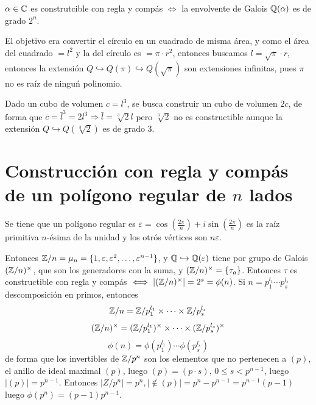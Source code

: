  \begin{teo}
    $\alpha \in \mathbb{C}$ es construtcible con regla y comp\'as $\iff$ la envolvente de Galois $\mathbb{Q}(\alpha)$ es de grado $2^n$.  
 \end{teo}
 \begin{custom}
 El objetivo era convertir el c\'irculo en un cuadrado de misma \'area, y como el \'area del cuadrado $=l^2$ y la del c\'irculo es $=\pi \cdot r^2$, entonces buscamos $ l = \sqrt{\pi} \cdot r$, entonces la extensi\'on $Q \hookrightarrow Q(\pi) \hookrightarrow Q(\sqrt{\pi})$ son extensiones infinitas, pues $\pi$ no es ra\'iz de ningu\'n polinomio.
 \end{custom}
 \begin{custom}
     Dado un cubo de volumen $c=l^3$, se busca construir un cubo de volumen $2c$, de forma que $\bar c = \bar l^3 = 2l^3 \Rightarrow \bar l = \sqrt[3]{2} l$
    pero $\sqrt[3]{2}$ no es constructible aunque la extensi\'on $Q \hookrightarrow Q(\sqrt[3]{2})$ es de grado 3. 
 \end{custom}
 \section{Construcci\'on con regla y comp\'as de un pol\'igono regular de $n$ lados}
 Se tiene que un pol\'igono regular es $\varepsilon = \cos(\frac{2\pi}{n}) + i \sin(\frac{2\pi}{n})$ es la ra\'iz primitiva $n$-\'esima de la unidad y los otr\'os v\'ertices son $n \varepsilon$. 

 Entonces $\mathbb{Z}/n = \mu_n = \{1, \varepsilon , \varepsilon^2, \ldots, \varepsilon^{n-1}\}$,  y  $\mathbb{Q} \hookrightarrow \mathbb{Q}(\varepsilon)$ tiene por grupo de Galois $(\mathbb{Z}/n)^{\times}$, que son los generadores con la suma, y $(\mathbb{Z}/n)^{\times} = \{\tau_a\}$. Entonces $\tau$ es constructible con regla y comp\'as $\iff |(\mathbb{Z}/n)^{\times}| = 2^s = \phi(n)$. Si $n=p_1^{l_1}\cdots p_s^{l_s}$ descomposici\'on en primos, entonces 
 $$\mathbb{Z} / n = \mathbb{Z} / p_1^{l_1} \times \cdots \times \mathbb{Z} / p_s^{l_s}$$
 $$(\mathbb{Z}/n)^{\times} = (\mathbb{Z} / p_1^{l_1})^{\times}  \times \cdots \times (\mathbb{Z} / p_s^{l_s} )^{\times} $$
 $$\phi(n) = \phi(p_1^{l_1})\cdots \phi(p_s^{l_s})$$
 de forma que los invertibles de $\mathbb{Z} / p^n$ son los elementos que no pertenecen a $(p)$, el anillo de ideal maximal $(p)$, luego $(p) = (p\cdot s ) ,\,  0 \le s < p^{n-1}$, luego $|(p)|=p^{n-1}$. Entonces $|Z/p^n|=p^n, |\nin (p) | = p^n - p^{n-1} = p^{n-1}(p-1)$ luego $\phi(p^n) = (p-1)p^{n-1}$. 

